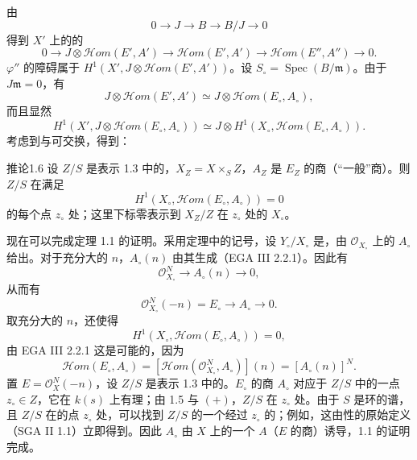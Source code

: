 由
\[
0\longrightarrow J\longrightarrow B\longrightarrow B/J\longrightarrow0
\]
得到 $X'$ 上的的
\[
0\longrightarrow J\otimes\mathcal H om(E',A')\longrightarrow\mathcal H om(E',A')\longrightarrow\mathcal H om(E'',A'')\longrightarrow0.
\]
 $\varphi''$ 的障碍属于 $H^1(X',J\otimes\mathcal H om(E',A'))$。设 $S_\circ=\operatorname{Spec}(B/\mathfrak m)$。由于 $J\mathfrak m=0$，有
\[
J\otimes\mathcal H om(E',A')\simeq J\otimes\mathcal H om(E_\circ,A_\circ),
\]
而且显然
\[
H^1(X',J\otimes\mathcal H om(E_\circ,A_\circ))\simeq J\otimes H^1(X_\circ,\mathcal H om(E_\circ,A_\circ)).
\]
考虑到与可交换，得到：
\begin{SGAresult}{推论}{1.6}
设 $Z/S$ 是表示 1.3 中的，$X_Z=X\times_S Z$，$A_Z$ 是 $E_Z$ 的商（“一般”商）。则 $Z/S$ 在满足
\[
H^1(X_\circ,\mathcal H om(E_\circ,A_\circ))=0
\]
的每个点 $z_\circ$ 处；这里下标零表示到 $X_Z/Z$ 在 $z_\circ$ 处的 $X_\circ$。
\end{SGAresult}
现在可以完成定理 1.1 的证明。采用定理中的记号，设 $Y_\circ/X_\circ$ 是，由 $\mathcal O_{X_\circ}$ 上的 $A_\circ$ 给出。对于充分大的 $n$，$A_\circ(n)$ 由其生成（EGA III 2.2.1）。因此有
\[
\mathcal O_{X_\circ}^{N}\longrightarrow A_\circ(n)\longrightarrow0,
\]
从而有
\[
\mathcal O_{X_\circ}^{N}(-n)=E_\circ\longrightarrow A_\circ\longrightarrow0.
\]
取充分大的 $n$，还使得
\[
H^1(X_\circ,\mathcal H om(E_\circ,A_\circ))=0,\tag{+}
\]
由 EGA III 2.2.1 这是可能的，因为
\[
\mathcal H om(E_\circ,A_\circ)=[\mathcal H om(\mathcal O_{X_\circ}^{N},A_\circ)](n)=[A_\circ(n)]^N.
\]
置 $E=\mathcal O_X^N(-n)$，设 $Z/S$ 是表示 1.3 中的。$E_\circ$ 的商 $A_\circ$ 对应于 $Z/S$ 中的一点 $z_\circ\in Z$，它在 $k(s)$ 上有理；由 1.5 与 $(+)$，$Z/S$ 在 $z_\circ$ 处。由于 $S$ 是环的谱，且 $Z/S$ 在的点 $z_\circ$ 处，可以找到 $Z/S$ 的一个经过 $z_\circ$ 的；例如，这由性的原始定义（SGA II 1.1）立即得到。因此 $A_\circ$ 由 $X$ 上的一个 $A$（$E$ 的商）诱导，1.1 的证明完成。

